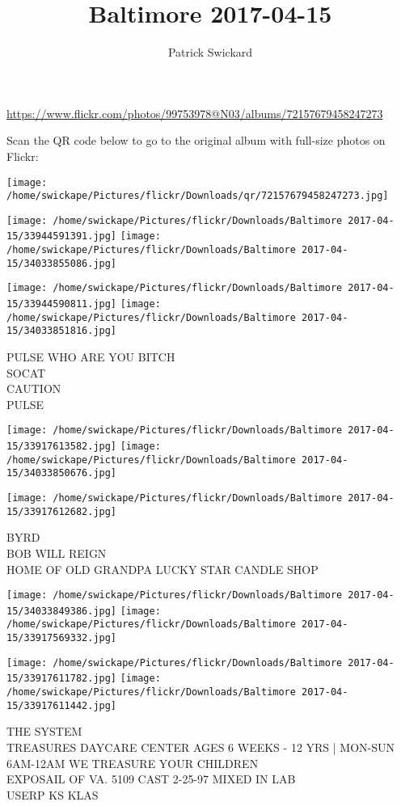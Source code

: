 \documentclass[10pt,letterpaper]{article}
\title{Baltimore 2017-04-15}
\author{Patrick Swickard}
\date{}
\begin{document}
\maketitle

\url{https://www.flickr.com/photos/99753978@N03/albums/72157679458247273}

Scan the QR code below to go to the original album with full-size photos on Flickr:

\texttt{[image: /home/swickape/Pictures/flickr/Downloads/qr/72157679458247273.jpg]}
\pagebreak

\texttt{[image: /home/swickape/Pictures/flickr/Downloads/Baltimore 2017-04-15/33944591391.jpg]}
\texttt{[image: /home/swickape/Pictures/flickr/Downloads/Baltimore 2017-04-15/34033855086.jpg]}

\texttt{[image: /home/swickape/Pictures/flickr/Downloads/Baltimore 2017-04-15/33944590811.jpg]}
\texttt{[image: /home/swickape/Pictures/flickr/Downloads/Baltimore 2017-04-15/34033851816.jpg]}

PULSE WHO ARE YOU BITCH\\
SOCAT\\
CAUTION\\
PULSE
\pagebreak

\texttt{[image: /home/swickape/Pictures/flickr/Downloads/Baltimore 2017-04-15/33917613582.jpg]}
\texttt{[image: /home/swickape/Pictures/flickr/Downloads/Baltimore 2017-04-15/34033850676.jpg]}

\vspace{0.25in}
\texttt{[image: /home/swickape/Pictures/flickr/Downloads/Baltimore 2017-04-15/33917612682.jpg]}

BYRD\\
BOB WILL REIGN\\
HOME OF OLD GRANDPA LUCKY STAR CANDLE SHOP
\pagebreak

\texttt{[image: /home/swickape/Pictures/flickr/Downloads/Baltimore 2017-04-15/34033849386.jpg]}
\texttt{[image: /home/swickape/Pictures/flickr/Downloads/Baltimore 2017-04-15/33917569332.jpg]}

\texttt{[image: /home/swickape/Pictures/flickr/Downloads/Baltimore 2017-04-15/33917611782.jpg]}
\texttt{[image: /home/swickape/Pictures/flickr/Downloads/Baltimore 2017-04-15/33917611442.jpg]}

THE SYSTEM\\
TREASURES DAYCARE CENTER AGES 6 WEEKS {-} 12 YRS | MON{-}SUN 6AM{-}12AM WE TREASURE YOUR CHILDREN\\
EXPOSAIL OF VA. 5109 CAST 2{-}25{-}97 MIXED IN LAB\\
USERP KS KLAS
\pagebreak
\end{document}
